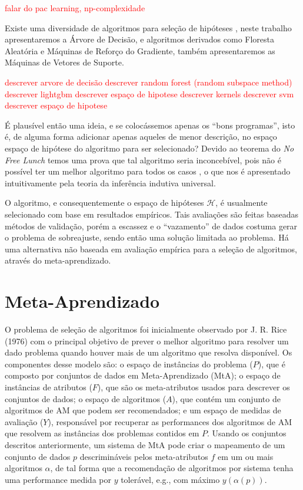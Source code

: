 \textcolor{red}{falar do pac learning, np-complexidade}

Existe uma diversidade de algoritmos para seleção de hipóteses \cite{bishop2006pattern,friedman2001elements}, neste trabalho apresentaremos a Árvore de Decisão, e algoritmos derivados como Floresta Aleatória e Máquinas de Reforço do Gradiente, também apresentaremos as Máquinas de Vetores de Suporte.

\textcolor{red}{
descrever arvore de decisão
descrever random forest (random subspace method)
descrever lightgbm
descrever espaço de hipotese
descrever kernels
descrever svm
descrever espaço de hipotese
}

É plausível então uma ideia, e se colocássemos apenas os ``bons programas'', isto é, de alguma forma adicionar apenas aqueles de menor descrição, no espaço espaço de hipótese do algoritmo para ser selecionado? Devido ao teorema do \textit{No Free Lunch} \cite{wolpert1997no,wolpert1996lack} temos uma prova que tal algoritmo seria inconcebível, pois não é possível ter um melhor algoritmo para todos os casos \cite{rathmanner2011philosophical}, o que nos é apresentado intuitivamente pela teoria da inferência indutiva universal.

O algoritmo, e consequentemente o espaço de hipóteses $\mathcal{H}$, é usualmente selecionado com base em resultados empíricos. Tais avaliações são feitas baseadas métodos de validação, porém a escassez e o ``vazamento'' de dados costuma gerar o problema de sobreajuste, sendo então uma solução limitada ao problema. Há uma alternativa não baseada em avaliação empírica para a seleção de algoritmos, através do meta-aprendizado.

\section{Meta-Aprendizado}
\label{sec:metalearning}
O problema de seleção de algoritmos foi inicialmente observado por J. R. Rice (1976) \cite{Rice1976} com o principal objetivo de prever o melhor algoritmo para resolver um dado problema quando houver mais de um algoritmo que resolva disponível.
Os componentes desse modelo são: o espaço de instâncias do problema ($P$), que é composto por conjuntos de dados em Meta-Aprendizado (MtA); o espaço de instâncias de atributos ($F$), que são os meta-atributos usados para descrever os conjuntos de dados; o espaço de algoritmos ($A$), que contém um conjunto de algoritmos de AM que podem ser recomendados; e um espaço de medidas de avaliação ($Y$), responsável por recuperar as performances dos algoritmos de AM que resolvem as instâncias dos problemas contidos em $P$.
Usando os conjuntos descritos anteriormente, um sistema de MtA pode criar o mapeamento de um conjunto de dados $p$ descrimináveis pelos meta-atributos $f$ em um ou mais algoritmos $\alpha$, de tal forma que a recomendação de algoritmos por sistema tenha uma performance medida por $y$ tolerável, e.g., com máximo $y(\alpha(p))$.

